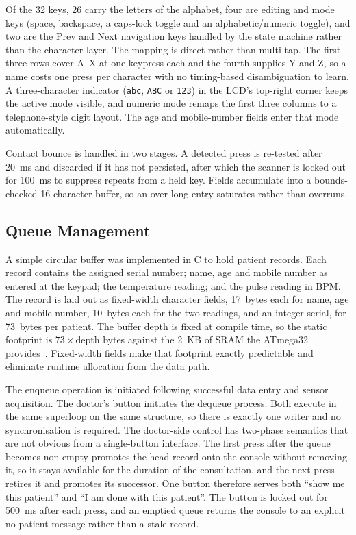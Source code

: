 Of the 32 keys, 26 carry the letters of the alphabet, four are editing and mode keys (space,
backspace, a caps-lock toggle and an alphabetic/numeric toggle), and two are the \textsf{Prev} and
\textsf{Next} navigation keys handled by the state machine rather than the character layer. The
mapping is direct rather than multi-tap. The first three rows cover A--X at one keypress each and the
fourth supplies Y and Z, so a name costs one press per character with no timing-based disambiguation
to learn. A three-character indicator (\texttt{abc}, \texttt{ABC} or \texttt{123}) in the LCD's
top-right corner keeps the active mode visible, and numeric mode remaps the first three columns to a
telephone-style digit layout. The age and mobile-number fields enter that mode automatically.

Contact bounce is handled in two stages. A detected press is re-tested after 20~ms and discarded if
it has not persisted, after which the scanner is locked out for 100~ms to suppress repeats from a
held key. Fields accumulate into a bounds-checked 16-character buffer, so an over-long entry
saturates rather than overruns.

\subsection{Queue Management}
A simple circular buffer was implemented in C to hold patient records. Each record contains the
assigned serial number; name, age and mobile number as entered at the keypad; the temperature
reading; and the pulse reading in BPM. The record is laid out as fixed-width character fields,
17~bytes each for name, age and mobile number, 10~bytes each for the two readings, and an integer
serial, for 73~bytes per patient. The buffer depth is fixed at compile time, so the static footprint
is $73 \times \mathrm{depth}$ bytes against the 2~KB of SRAM the ATmega32
provides~\cite{microchip2020}. Fixed-width fields make that footprint exactly predictable and
eliminate runtime allocation from the data path.

The enqueue operation is initiated following successful data entry and sensor acquisition. The
doctor's button initiates the dequeue process. Both execute in the same superloop on the same
structure, so there is exactly one writer and no synchronisation is required. The doctor-side control
has two-phase semantics that are not obvious from a single-button interface. The first press after
the queue becomes non-empty promotes the head record onto the console without removing it, so it
stays available for the duration of the consultation, and the next press retires it and promotes its
successor. One button therefore serves both ``show me this patient'' and ``I am done with this
patient''. The button is locked out for 500~ms after each press, and an emptied queue returns the
console to an explicit no-patient message rather than a stale record.

